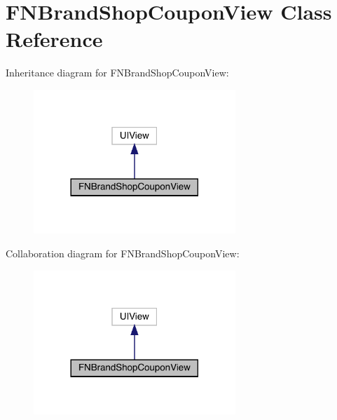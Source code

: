 \hypertarget{interface_f_n_brand_shop_coupon_view}{}\section{F\+N\+Brand\+Shop\+Coupon\+View Class Reference}
\label{interface_f_n_brand_shop_coupon_view}


Inheritance diagram for F\+N\+Brand\+Shop\+Coupon\+View\+:\nopagebreak
\begin{figure}[H]
\begin{center}
\leavevmode
\includegraphics[width=216pt]{interface_f_n_brand_shop_coupon_view__inherit__graph}
\end{center}
\end{figure}


Collaboration diagram for F\+N\+Brand\+Shop\+Coupon\+View\+:\nopagebreak
\begin{figure}[H]
\begin{center}
\leavevmode
\includegraphics[width=216pt]{interface_f_n_brand_shop_coupon_view__coll__graph}
\end{center}
\end{figure}
